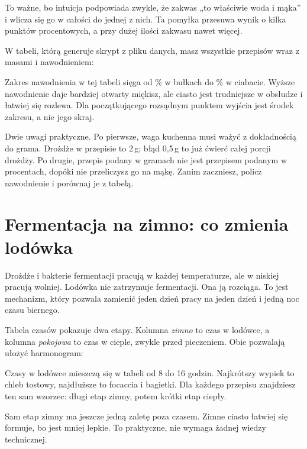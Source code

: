 To ważne, bo intuicja podpowiada zwykle, że zakwas „to właściwie woda i mąka” i wlicza się go w całości do jednej z nich. Ta pomyłka przesuwa wynik o kilka punktów procentowych, a przy dużej ilości zakwasu nawet więcej.

W tabeli, którą generuje skrypt z pliku danych, masz wszystkie  przepisów wraz z masami i nawodnieniem:


Zakres nawodnienia w tej tabeli sięga od \% w bułkach do \% w ciabacie. Wyższe nawodnienie daje bardziej otwarty miękisz, ale ciasto jest trudniejsze w obsłudze i łatwiej się rozlewa. Dla początkującego rozsądnym punktem wyjścia jest środek zakresu, a nie jego skraj.

Dwie uwagi praktyczne. Po pierwsze, waga kuchenna musi ważyć z dokładnością do grama. Drożdże w przepisie to 2\,g; błąd 0,5\,g to już ćwierć całej porcji drożdży. Po drugie, przepis podany w gramach nie jest przepisem podanym w procentach, dopóki nie przeliczysz go na mąkę. Zanim zaczniesz, policz nawodnienie i porównaj je z tabelą.

\section{Fermentacja na zimno: co zmienia lodówka}

Drożdże i bakterie fermentacji pracują w każdej temperaturze, ale w niskiej pracują wolniej. Lodówka nie zatrzymuje fermentacji. Ona ją rozciąga. To jest mechanizm, który pozwala zamienić jeden dzień pracy na jeden dzień i jedną noc czasu biernego.

Tabela czasów pokazuje dwa etapy. Kolumna \emph{zimno} to czas w lodówce, a kolumna \emph{pokojowa} to czas w cieple, zwykle przed pieczeniem. Obie pozwalają ułożyć harmonogram:


Czasy w lodówce mieszczą się w tabeli od 8 do 16 godzin. Najkrótszy wypiek to chleb tostowy, najdłuższe to focaccia i bagietki. Dla każdego przepisu znajdziesz ten sam wzorzec: długi etap zimny, potem krótki etap ciepły.

Sam etap zimny ma jeszcze jedną zaletę poza czasem. Zimne ciasto łatwiej się formuje, bo jest mniej lepkie. To praktyczne, nie wymaga żadnej wiedzy technicznej.

